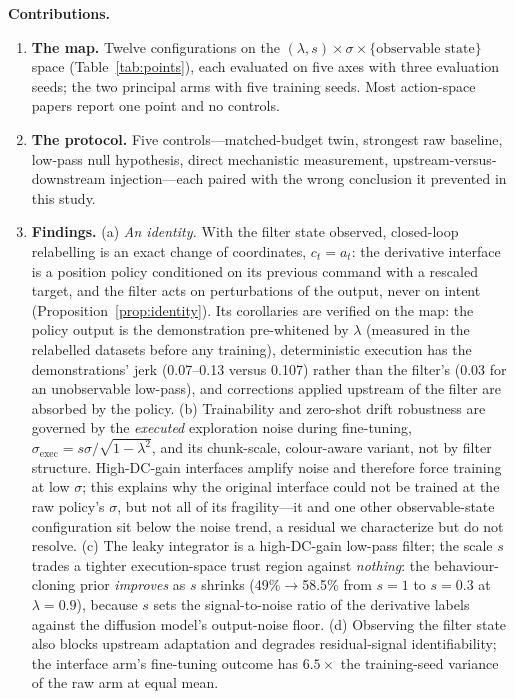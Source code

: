 \documentclass[conference]{IEEEtran}
\newcommand{\sexec}{\sigma_{\mathrm{exec}}}
\begin{document}
\textbf{Contributions.}
\begin{enumerate}
\item \textbf{The map.} Twelve configurations on the $(\lambda,s)\times\sigma\times\{\text{observable state}\}$ space (Table~\ref{tab:points}), each evaluated on five axes with three evaluation seeds; the two principal arms with five training seeds. Most action-space papers report one point and no controls.
\item \textbf{The protocol.} Five controls---matched-budget twin, strongest raw baseline, low-pass null hypothesis, direct mechanistic measurement, upstream-versus-downstream injection---each paired with the wrong conclusion it prevented in this study.
\item \textbf{Findings.} (a) \emph{An identity.} With the filter state observed, closed-loop relabelling is an exact change of coordinates, $c_t=a_t$: the derivative interface is a position policy conditioned on its previous command with a rescaled target, and the filter acts on perturbations of the output, never on intent (Proposition~\ref{prop:identity}). Its corollaries are verified on the map: the policy output is the demonstration pre-whitened by $\lambda$ (measured in the relabelled datasets before any training), deterministic execution has the demonstrations' jerk (0.07--0.13 versus 0.107) rather than the filter's (0.03 for an unobservable low-pass), and corrections applied upstream of the filter are absorbed by the policy. (b) Trainability and zero-shot drift robustness are governed by the \emph{executed} exploration noise during fine-tuning, $\sexec=s\sigma/\sqrt{1-\lambda^2}$, and its chunk-scale, colour-aware variant, not by filter structure. High-DC-gain interfaces amplify noise and therefore force training at low $\sigma$; this explains why the original interface could not be trained at the raw policy's $\sigma$, but not all of its fragility---it and one other observable-state configuration sit below the noise trend, a residual we characterize but do not resolve. (c) The leaky integrator is a high-DC-gain low-pass filter; the scale $s$ trades a tighter execution-space trust region against \emph{nothing}: the behaviour-cloning prior \emph{improves} as $s$ shrinks (49\%$\to$58.5\% from $s=1$ to $s=0.3$ at $\lambda=0.9$), because $s$ sets the signal-to-noise ratio of the derivative labels against the diffusion model's output-noise floor. (d) Observing the filter state also blocks upstream adaptation and degrades residual-signal identifiability; the interface arm's fine-tuning outcome has $6.5\times$ the training-seed variance of the raw arm at equal mean.
\end{enumerate}
\end{document}
